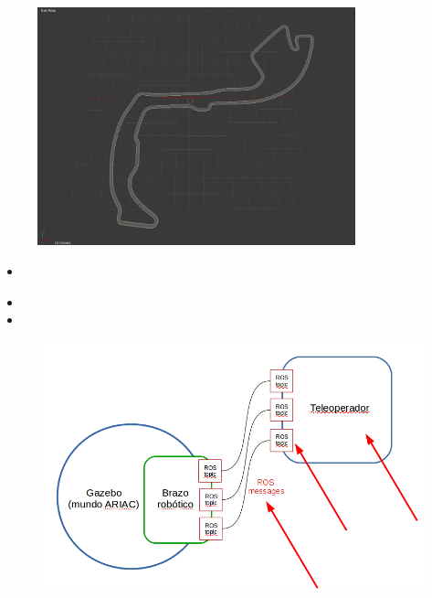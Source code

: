 \documentclass[notes,slidesec,a4]{seminar}
\begin{document}
\begin{hslide}
	\begin{center}
		\begin{figure}
			\includegraphics[width=0.82\textwidth]{Circuito00.png}
		\end{figure}
	\end{center}
\end{hslide}


\begin{hslide}
	\begin{itemize}
		\item 
	\end{itemize}
\end{hslide}

\begin{hslide}
	\begin{itemize}
		\item 

		\item 
	\end{itemize}
\end{hslide}

\begin{hslide}
	\begin{center}
		\begin{figure}
			\includegraphics[width=\textwidth]{graficobrazo.png}
		\end{figure}
	\end{center}
\end{hslide}
\end{document}
